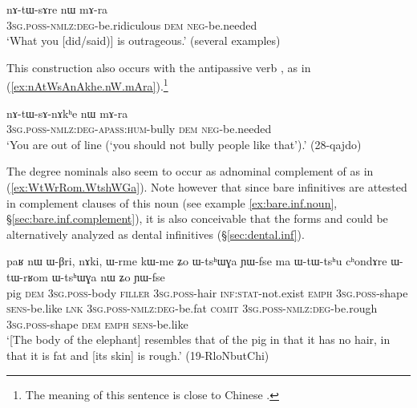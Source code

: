 \begin{exe}
\ex \label{ex:nAtWsAre.nW.mAra}
\gll  nɤ-tɯ-sɤre nɯ mɤ-ra \\
\textsc{3sg}.\textsc{poss}-\textsc{nmlz}:\textsc{deg}-be.ridiculous \textsc{dem} \textsc{neg}-be.needed \\
\glt `What you [did/said)] is outrageous.' (several examples) 
\end{exe}

This construction also occurs with the antipassive verb , as in (\ref{ex:nAtWsAnAkhe.nW.mAra}).\footnote{The meaning of this sentence is close to Chinese .
}

\begin{exe}
\ex \label{ex:nAtWsAnAkhe.nW.mAra}
\gll nɤ-tɯ-sɤ-nɤkʰe nɯ mɤ-ra \\
\textsc{3sg}.\textsc{poss}-\textsc{nmlz}:\textsc{deg}-\textsc{apass}:\textsc{hum}-bully \textsc{dem} \textsc{neg}-be.needed \\
\glt `You are out of line (`you should not bully people like that').'  (28-qajdo) 
\end{exe}

The degree nominals also seem to occur as adnominal complement of  as in (\ref{ex:WtWrRom.WtshWGa}). Note however that since bare infinitives are attested in complement clauses of this noun (see example \ref{ex:bare.inf.noun}, §\ref{sec:bare.inf.complement}), it is also conceivable that the forms  and  could be alternatively analyzed as dental infinitives (§\ref{sec:dental.inf}).

\begin{exe}
\ex \label{ex:WtWrRom.WtshWGa}
\gll  paʁ nɯ ɯ-βri, nɤki, ɯ-rme kɯ-me ʑo ɯ-tsʰɯɣa ɲɯ-fse ma ɯ-tɯ-tsʰu cʰondɤre ɯ-tɯ-rʁom ɯ-tsʰɯɣa nɯ ʑo ɲɯ-fse \\
pig \textsc{dem} \textsc{3sg}.\textsc{poss}-body \textsc{filler} \textsc{3sg}.\textsc{poss}-hair \textsc{inf}:\textsc{stat}-not.exist \textsc{emph} \textsc{3sg}.\textsc{poss}-shape \textsc{sens}-be.like \textsc{lnk} \textsc{3sg}.\textsc{poss}-\textsc{nmlz}:\textsc{deg}-be.fat \textsc{comit} \textsc{3sg}.\textsc{poss}-\textsc{nmlz}:\textsc{deg}-be.rough \textsc{3sg}.\textsc{poss}-shape \textsc{dem} \textsc{emph} \textsc{sens}-be.like \\
\glt `[The body of the elephant] resembles that of the pig in that it has no hair, in that it is fat and [its skin] is rough.' (19-RloNbutChi)
\end{exe}


